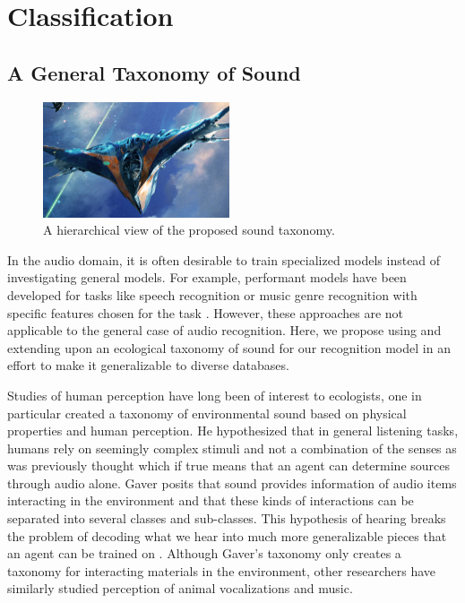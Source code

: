 \section{Classification}

\subsection{A General Taxonomy of Sound}

\begin{figure}[h!]
    \centering
    \includegraphics[width=0.49\textwidth]{figures/sound-hierarchy.jpg}
    \caption{A hierarchical view of the proposed sound taxonomy.}
    \label{fig:sound-hierarchy}
\end{figure}

In the audio domain, it is often desirable to train specialized models instead
of investigating general models. For example, performant models have been
developed for tasks like speech recognition or music genre recognition with
specific features chosen for the task \cite{Campbell1997,
tzanetakis-musical-2002}. However, these approaches are not applicable to the
general case of audio recognition. Here, we propose using and extending upon an
ecological taxonomy of sound for our recognition model in an effort to make it
generalizable to diverse databases.

Studies of human perception have long been of interest to ecologists, one in
particular created a taxonomy of environmental sound based on physical
properties and human perception. He hypothesized that in general listening
tasks, humans rely on seemingly complex stimuli and not a combination of the
senses as was previously thought which if true means that an agent can determine
sources through audio alone. Gaver posits that sound provides information of
audio items interacting in the environment and that these kinds of interactions
can be separated into several classes and sub-classes. This hypothesis of
hearing breaks the problem of decoding what we hear into much more generalizable
pieces that an agent can be trained on \cite{Gaver1993}. Although Gaver's
taxonomy only creates a taxonomy for interacting materials in the environment,
other researchers have similarly studied perception of animal vocalizations and
music.

